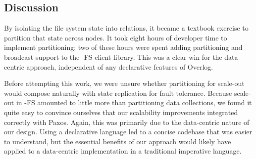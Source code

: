 \subsection{Discussion}
By isolating the file system state into relations, it became a textbook exercise
to partition that state across nodes.  It took eight hours of developer time to
implement \NN partitioning; two of these hours were spent adding partitioning
and broadcast support to the \BOOM-FS client library.  This was a clear win for
the data-centric approach, independent of any declarative features of Overlog.

Before attempting this work, we were unsure whether partitioning for scale-out
would compose naturally with state replication for fault tolerance. Because
scale-out in \BOOM-FS amounted to little more than partitioning data
collections, we found it quite easy to convince ourselves that our scalability
improvements integrated correctly with Paxos. Again, this was primarily due to
the data-centric nature of our design. Using a declarative language
led to a concise codebase that was easier to understand, but the essential
benefits of our approach would likely have applied to a data-centric
implementation in a traditional imperative language.
